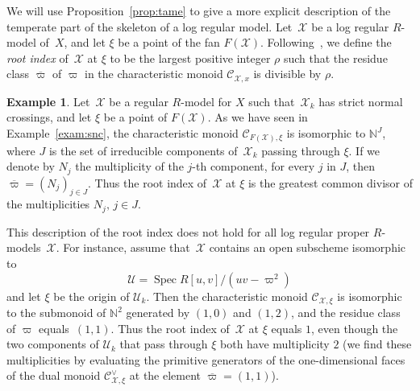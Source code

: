 \documentclass[11pt]{article}
\let\mathcal\mathscr
\theoremstyle{definition}
\newtheorem{example}[equation]{Example}
\numberwithin{equation}{subsection}
\newcommand{\N}{\ensuremath{\mathbb{N}}}
\newcommand{\cX}{\ensuremath{\mathscr{X}}}
\newcommand{\cU}{\ensuremath{\mathscr{U}}}
\DeclareMathOperator{\Spec}{Spec}
\let\unif\varpi
\begin{document}
We will use Proposition~\ref{prop:tame} to give a more explicit description of the temperate part of the skeleton of a log regular model.
Let~$\cX$ be a log regular $R$\nobreakdash-model of~$X$, and let $\xi$ be a point of the fan $F(\cX)$. Following~\cite{logzeta}, we define the {\em root index} of~$\cX$ at $\xi$ to be the largest positive integer $\rho$ such that the residue class $\overline{\unif}$ of $\unif$
in the characteristic monoid $\mathcal{C}_{\cX,x}$ is divisible by $\rho$.

\begin{example}
Let~$\cX$ be a regular $R$\nobreakdash-model for $X$ such that~$\cX_k$ has strict normal crossings, and let $\xi$ be a point of $F(\cX)$.
As we have seen in Example~\ref{exam:snc}, the characteristic monoid $\mathcal{C}_{F(\cX),\xi}$ is isomorphic to $\N^J$, where $J$ is the set of irreducible components of~$\cX_k$ passing through $\xi$. If we denote by $N_j$ the multiplicity of the $j$-th component, for every $j$ in $J$, then $\overline{\unif}=(N_j)_{j\in J}$.
Thus the root index of~$\cX$ at $\xi$ is the greatest common divisor of the multiplicities $N_j,\,j\in J$.

This description of the root index does not hold for all log regular proper $R$\nobreakdash-models~$\cX$. For instance, assume that~$\cX$ contains an open subscheme isomorphic to
\[
\cU=\Spec R[u,v]/(uv-\varpi^2)
\]
and let $\xi$ be the origin of $\cU_k$.
Then the characteristic monoid
$\mathcal{C}_{\cX,\xi}$ is isomorphic to the submonoid of $\N^2$ generated by $(1,0)$ and $(1,2)$, and the residue class of $\unif$ equals~$(1,1)$. Thus the root index of~$\cX$ at $\xi$ equals $1$, even though the two components of $\cU_k$ that pass through $\xi$ both have multiplicity $2$ (we find these multiplicities by evaluating the primitive generators of the one-dimensional faces of the dual monoid $\mathcal{C}^{\vee}_{\cX,\xi}$ at the element $\overline{\unif}=(1,1)$).
\end{example}
\end{document}
